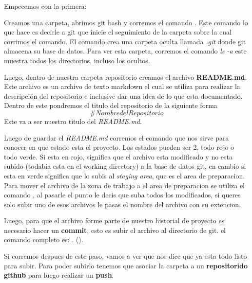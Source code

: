 \documentclass[10pt,journal,compsoc]{IEEEtran}
\begin{document}
Empecemos con la primera:

Creamos una carpeta, abrimos git bash y corremos el comando \textit{\color{Blue}{git init}}. Este comando lo que hace es decirle a git que inicie el seguimiento de la carpeta sobre la cual corrimos el comando. El comando crea una carpeta oculta llamada \textit{.git} donde git almacena su base de datos. Para ver esta carpeta, corremos el comando \textit{ls -a} este muestra todos los directorios, incluso los ocultos.

Luego, dentro de nuestra carpeta repositorio creamos el archivo \textbf{README.md}. Este archivo es un archivo de texto markdown el cual se utiliza para realizar la descripción del repositorio e inclusive dar una idea de lo que esta documentado. Dentro de este pondremos el titulo del repositorio de la siguiente forma 
$$ \# Nombre del Repositorio $$
Este va a ser nuestro titulo del \textit{README.md}.

Luego de guardar el \textit{README.md} corremos el comando \textit{\color{Blue}{git status}} que nos sirve para conocer en que estado esta el proyecto. Los estados pueden ser 2, todo rojo o todo verde. Si esta en rojo, significa que el archivo esta modificado y no esta subido (todabia esta en el working directory) a la base de datos git, en cambio si esta en verde significa que lo subis al \textit{staging area}, que es el area de preparacion. Para mover el archivo de la zona de trabajo a el area de preparacion se utiliza el comando \textit{\color{Blue}{git add .}}, al pasarle el punto le decis que suba todos los modificados, si queres solo subir uno de esos archivos le pasas el nombre del archivo con su extencion.

Luego, para que el archivo forme parte de nuestro historial de proyecto es necesario hacer un \textbf{commit}, esto es subir el archivo al directorio de git. el comando completo es: \textit{\color{Blue}{git commit -m $"$Comentario que represente al commit$"$}}. (\textit{\color{Red}{No necesariamente se abre vim para agregar el mensaje, que es lo que dice en el tutorial, lo mas rapido es hacer el comando como se los pase yo sin tener que entrar a ningun editor de texto para escribir el mensaje}}). 

Si corremos \textit{\color{Blue}{git status}} despues de este paso, vamos a ver que nos dice que ya esta todo listo para subir. Para poder subirlo tenemos que asociar la carpeta a un \textbf{repositorido github} para luego realizar  un \textbf{push}.
\end{document}
